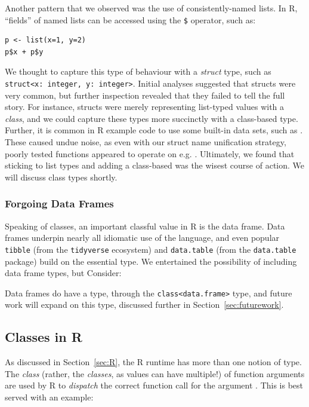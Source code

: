 \documentclass[acmsmall,review,anonymous]{acmart}\settopmatter{printfolios=true,printccs=false,printacmref=false}
\newcommand{\code}[1]{{\lstinline[style=Rin]!#1!}\xspace}
\begin{document}
Another pattern that we observed was the use of consistently-named lists.
In R, ``fields'' of named lists can be accessed using the \code{$} operator, such as:
\begin{lstlisting}
p <- list(x=1, y=2)
p$x + p$y
\end{lstlisting}
We thought to capture this type of behaviour with a {\it struct} type, such as \code{struct<x: integer, y: integer>}.
Initial analyses suggested that structs were very common, but further inspection revealed that they failed to tell the full story.
For instance,  structs were merely representing list-typed values with a {\it class}, and we could capture these types more succinctly with a class-based type.
Further, it is common in R example code to use some built-in data sets, such as .
These caused undue noise, as even with our struct name unification strategy, poorly tested functions appeared to operate on e.g. .
Ultimately, we found that sticking to list types and adding a class-based was the wisest course of action.
We will discuss class types shortly.

%
%
\subsubsection{Forgoing Data Frames}

Speaking of classes, an important classful value in R is the data frame.
Data frames underpin nearly all idiomatic use of the language, and even popular \code{tibble} (from the \code{tidyverse} ecosystem) and \code{data.table} (from the \code{data.table} package) build on the essential type.
We entertained the possibility of including data frame types, but 
Consider: 

Data frames do have a type, through the \code{class<data.frame>} type, and future work will expand on this type, discussed further in Section~\ref{sec:futurework}.

%
%
%
%
\subsection{Classes in R}

As discussed in Section~\ref{sec:R}, the R runtime has more than one notion of type.
The {\it class} (rather, the {\it classes}, as values can have multiple!) of function arguments are used by R to {\it dispatch} the correct function call for the argument .
This is best served with an example:
\end{document}
